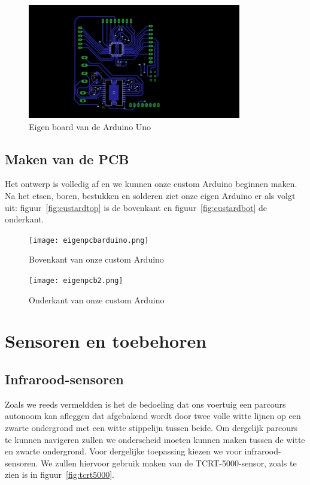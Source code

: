 \begin{figure}[H]
	\centering
	\includegraphics[height=5cm]{bottomboard.png}
	\caption{Eigen board van de Arduino Uno\label{fig:bottomboard}}
\end{figure}
\subsection{Maken van de PCB}
Het ontwerp is volledig af en we kunnen onze custom Arduino beginnen maken. Na het etsen, boren, bestukken en solderen ziet onze eigen Arduino er als volgt uit: figuur~\vref{fig:custardtop} is de bovenkant en figuur~\vref{fig:custardbot} de onderkant.

\begin{figure}[H]
	\centering
	\texttt{[image: eigenpcbarduino.png]}
	\caption{Bovenkant van onze custom Arduino\label{fig:custardtop}}
\end{figure}

\begin{figure}[H]
	\centering
	\texttt{[image: eigenpcb2.png]}
	\caption{Onderkant van onze custom Arduino\label{fig:custardbot}}
\end{figure}



 
\section{Sensoren en toebehoren}
\subsection{Infrarood-sensoren}
Zoals we reeds vermeldden is het de bedoeling dat ons voertuig een parcours autonoom kan afleggen dat afgebakend wordt door twee volle witte lijnen op een zwarte ondergrond met een witte stippelijn tussen beide. Om dergelijk parcours te kunnen navigeren zullen we onderscheid moeten kunnen maken tussen de witte en zwarte ondergrond. Voor dergelijke toepassing kiezen we voor infrarood-sensoren. We zullen hiervoor gebruik maken van de TCRT-5000-sensor, zoals te zien is in figuur~\vref{fig:tcrt5000}. 

